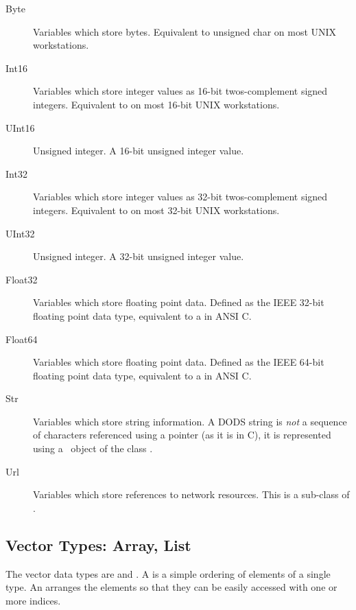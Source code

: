 \begin{description}

\item [Byte] Variables which store bytes. Equivalent to unsigned
char on most UNIX workstations.

\item [Int16] Variables which store integer values as 16-bit
twos-complement  signed integers. Equivalent to  on
most 16-bit UNIX workstations.

\item [UInt16] Unsigned integer.  A 16-bit unsigned integer value.

\item [Int32] Variables which store integer values as 32-bit
twos-complement  signed integers. Equivalent to  on
most 32-bit UNIX workstations.

\item [UInt32] Unsigned integer.  A 32-bit unsigned integer value.

\item [Float32] Variables which store floating point data.
Defined as the  IEEE 32-bit floating point data type, equivalent
to a  in ANSI  C.

\item [Float64] Variables which store floating point data.
Defined as the  IEEE 64-bit floating point data type, equivalent
to a  in ANSI  C.

\item [Str] Variables which store string information. A DODS string is
\emph{not} a sequence of characters referenced using a pointer (as it is in
C), it is represented using a \Cpp\ object of the class . 

\item [Url] Variables which store references to network
resources. This is a sub-class of .

\end{description}

\subsection{Vector Types: Array, List}

The vector data types are  and . A
  is a simple ordering of elements of a single type.  An
  arranges the elements so that they can be easily
 accessed with one or more indices.  

